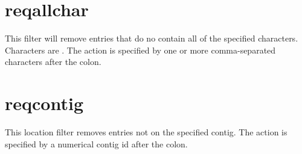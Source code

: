 \documentclass[letterpaper,11pt,english]{sphinxmanual}
\begin{document}
%
\begin{sphinxVerbatim}[commandchars=\\\{\}]
  
 
 
\end{sphinxVerbatim}


\section{reqallchar}
\label{\detokenize{mvf_filter_modules:reqallchar}}
This filter will remove entries that do no contain all of the specified
characters. Characters are . The action is
specified by one or more comma-separated characters after the colon.

%
\begin{sphinxVerbatim}[commandchars=\\\{\}]
  
 
 
 
\end{sphinxVerbatim}


\section{reqcontig}
\label{\detokenize{mvf_filter_modules:reqcontig}}
This location filter removes entries not on the specified contig.
The action is specified by a numerical contig id after the colon.

%
\begin{sphinxVerbatim}[commandchars=\\\{\}]
  
 
 
 
\end{sphinxVerbatim}
\end{document}
